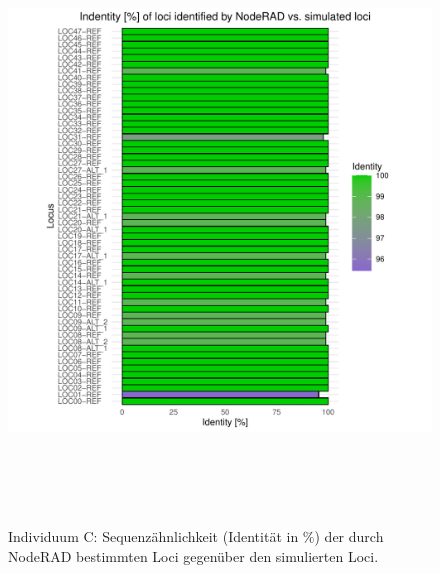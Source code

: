 \begin{figure}[H]
	\begin{center}
		\includegraphics[height=16cm]{bilder/evaluation/perc_ident/C.plot_loci.pdf}
		\caption{Individuum C: Sequenzähnlichkeit (Identität in $ \% $) der durch NodeRAD bestimmten Loci gegenüber den simulierten Loci.}
	\end{center}
\end{figure}

